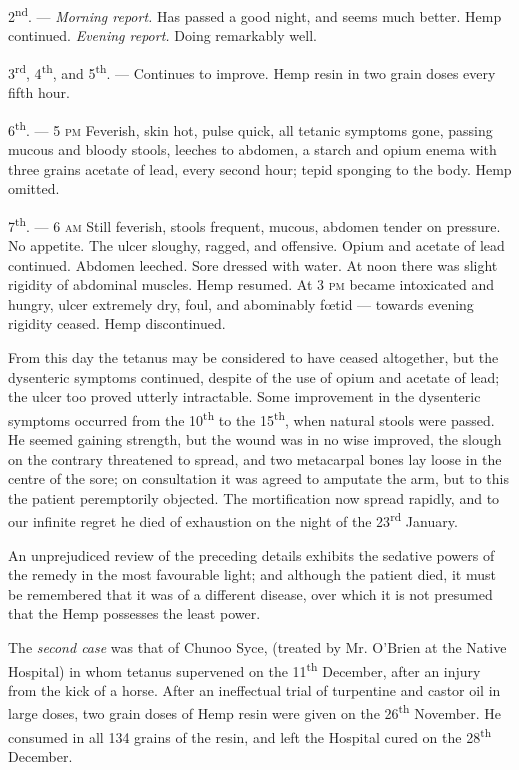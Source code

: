 \documentclass[a4paper, 11pt, oneside, polutonikogreek, english]{article}
\begin{document}
2\textsuperscript{nd}. --- \emph{Morning report.} Has passed a good night, and seems much better. Hemp continued. \emph{Evening report.} Doing remarkably well.

3\textsuperscript{rd}, 4\textsuperscript{th}, and 5\textsuperscript{th}. --- Continues to improve. Hemp resin in two grain doses every fifth hour.

6\textsuperscript{th}. --- 5 \textsc{pm} Feverish, skin hot, pulse quick, all tetanic symptoms gone, passing mucous and bloody stools, leeches to abdomen, a starch and opium enema with three grains acetate of lead, every second hour; tepid sponging to the body. Hemp omitted.

7\textsuperscript{th}. --- 6 \textsc{am} Still feverish, stools frequent, mucous, abdomen tender on pressure. No appetite. The ulcer sloughy, ragged, and offensive. Opium and acetate of lead continued. Abdomen leeched. Sore dressed with water. At noon there was slight rigidity of abdominal muscles. Hemp resumed. At 3 \textsc{pm} became intoxicated and hungry, ulcer extremely dry, foul, and abominably fœtid --- towards evening rigidity ceased. Hemp discontinued.

From this day the tetanus may be considered to have ceased altogether, but the dysenteric symptoms continued, despite of the use of opium and acetate of lead; the ulcer too proved utterly intractable. Some improvement in the dysenteric symptoms occurred from the 10\textsuperscript{th} to the 15\textsuperscript{th}, when natural stools were passed. He seemed gaining strength, but the wound was in no wise improved, the slough on the contrary threatened to spread, and two metacarpal bones lay loose in the centre of the sore; on consultation it was agreed to amputate the arm, but to this the patient peremptorily objected. The mortification now spread rapidly, and to our infinite regret he died of exhaustion on the night of the 23\textsuperscript{rd} January.

An unprejudiced review of the preceding details exhibits the sedative powers of the remedy in the most favourable light; and although the patient died, it must be remembered that it was of a different disease, over which it is not presumed that the Hemp possesses the least power.

The \emph{second case} was that of Chunoo Syce, (treated by Mr. O'Brien at the Native Hospital) in whom tetanus supervened on the 11\textsuperscript{th} December, after an injury from the kick of a horse. After an ineffectual trial of turpentine and castor oil in large doses, two grain doses of Hemp resin were given on the 26\textsuperscript{th} November. He consumed in all 134 grains of the resin, and left the Hospital cured on the 28\textsuperscript{th} December.
\end{document}
